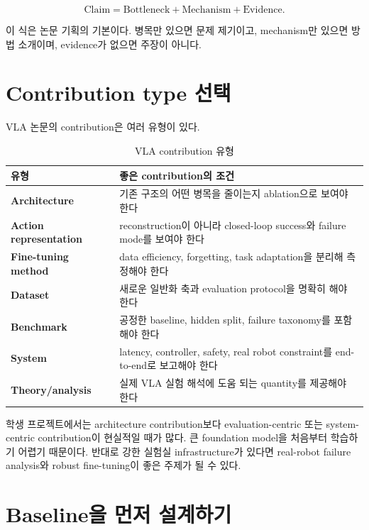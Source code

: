 \begin{equation}
  \mathrm{Claim}
  =
  \mathrm{Bottleneck}
  +
  \mathrm{Mechanism}
  +
  \mathrm{Evidence}.
\end{equation}

이 식은 논문 기획의 기본이다. 병목만 있으면 문제 제기이고, mechanism만 있으면 방법 소개이며, evidence가 없으면 주장이 아니다.

\section{Contribution type 선택}

VLA 논문의 contribution은 여러 유형이 있다.

\begin{table}[t]
  \centering
  \caption{VLA contribution 유형}
  \label{tab:vla_contribution_types}
  \begin{tabularx}{\textwidth}{>{\bfseries}p{30mm}X}
    \toprule
    유형 & 좋은 contribution의 조건 \\
    \midrule
    Architecture & 기존 구조의 어떤 병목을 줄이는지 ablation으로 보여야 한다 \\
    Action representation & reconstruction이 아니라 closed-loop success와 failure mode를 보여야 한다 \\
    Fine-tuning method & data efficiency, forgetting, task adaptation을 분리해 측정해야 한다 \\
    Dataset & 새로운 일반화 축과 evaluation protocol을 명확히 해야 한다 \\
    Benchmark & 공정한 baseline, hidden split, failure taxonomy를 포함해야 한다 \\
    System & latency, controller, safety, real robot constraint를 end-to-end로 보고해야 한다 \\
    Theory/analysis & 실제 VLA 실험 해석에 도움 되는 quantity를 제공해야 한다 \\
    \bottomrule
  \end{tabularx}
\end{table}

학생 프로젝트에서는 architecture contribution보다 evaluation-centric 또는 system-centric contribution이 현실적일 때가 많다. 큰 foundation model을 처음부터 학습하기 어렵기 때문이다. 반대로 강한 실험실 infrastructure가 있다면 real-robot failure analysis와 robust fine-tuning이 좋은 주제가 될 수 있다.

\section{Baseline을 먼저 설계하기}

